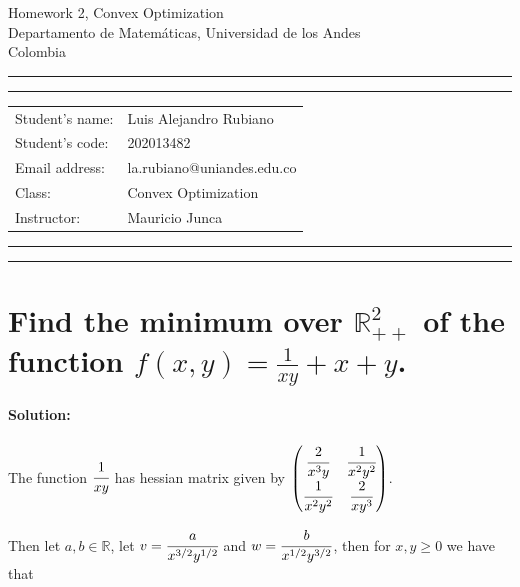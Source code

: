 \documentclass[10pt]{article}
\makeatletter
\newcommand{\studentname}{Luis Alejandro Rubiano}
\newcommand{\studentnumber}{202013482}
\newcommand{\researchcentre}{la.rubiano@uniandes.edu.co}
\newcommand{\projecttitle}{Convex Optimization}
\newcommand{\supervisor}{Mauricio Junca}
\makeatother
\begin{document}
\begin{center}
{\Huge{Homework 2, Convex Optimization}} \\
\vspace{2mm}
{\Large{Departamento de Matemáticas, Universidad de los Andes}} \\
\vspace{1mm}
{\Large{Colombia}}
\end{center}

\vspace{5mm}
\hrule
\vspace{1mm}
\hrule

\vspace{3mm}
\begin{tabular}{ll} 
Student's name:           	        & {\studentname}   \\ 
Student's code: 	        & {\studentnumber} \\ 
Email address: 	        & {\researchcentre}  \\ 
Class: 	& {\projecttitle}  \\ 
Instructor: 	    & {\supervisor}  \\ 
\end{tabular}

\vspace{3mm}
\hrule
\vspace{1mm}
\hrule

\hfill \break %

\section{Find the minimum over $\mathbb{R}_{++}^2$ of the function $f(x,y) = \frac{1}{xy} + x + y$.}



\paragraph{Solution:}


The function $\cfrac{1}{xy}$ has hessian matrix given by $
\begin{pmatrix}
\cfrac{2}{x^3y} & \cfrac{1}{x^2y^2} \\
\cfrac{1}{x^2y^2} & \cfrac{2}{xy^3} 
\end{pmatrix}
$. 

Then let $a,b \in \mathbb{R}$, let $v=\cfrac{a}{x^{3/2} y^{1/2}}$ and $w=\cfrac{b}{x^{1/2} y^{3/2}}$, then for $x,y \geq 0$ we have that 
\end{document}
